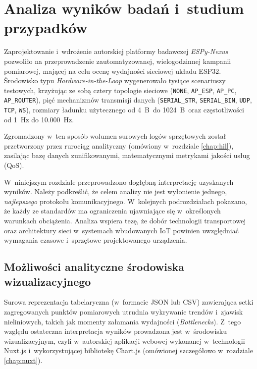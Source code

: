 \chapter{Analiza wyników badań i~studium przypadków}
\label{chap:analiza_wynikow}

Zaprojektowanie i~wdrożenie autorskiej platformy badawczej \textit{ESPy-Nexus} pozwoliło na przeprowadzenie zautomatyzowanej, wielogodzinnej kampanii pomiarowej, mającej na celu ocenę wydajności sieciowej układu ESP32.
Środowisko typu \textit{Hardware-in-the-Loop} wygenerowało tysiące scenariuszy testowych, krzyżując ze sobą cztery topologie sieciowe (\texttt{NONE}, \texttt{AP\_ESP}, \texttt{AP\_PC}, \texttt{AP\_ROUTER}), pięć mechanizmów transmisji danych (\texttt{SERIAL\_STR}, \texttt{SERIAL\_BIN}, \texttt{UDP}, \texttt{TCP}, \texttt{WS}), rozmiary ładunku użytecznego od 4~B~do 1024~B~oraz częstotliwości od 1~Hz do 10.000~Hz.

Zgromadzony w~ten sposób wolumen surowych logów sprzętowych został przetworzony przez rurociąg analityczny (omówiony w~rozdziale \ref{chap:hil}), zasilając bazę danych zunifikowanymi, matematycznymi metrykami jakości usług (QoS).

W~niniejszym rozdziale przeprowadzono dogłębną interpretację uzyskanych wyników.
Należy podkreślić, że celem analizy nie jest wyłonienie jednego, \textit{najlepszego} protokołu komunikacyjnego.
W~kolejnych podrozdziałach pokazano, że każdy ze standardów ma ograniczenia ujawniające się w~określonych warunkach obciążenia.
Analiza wspiera tezę, że dobór technologii transportowej oraz architektury sieci w~systemach wbudowanych IoT powinien uwzględniać wymagania czasowe i~sprzętowe projektowanego urządzenia.

\section{Możliwości analityczne środowiska wizualizacyjnego}
\label{sec:wizualizacja_nuxt}

Surowa reprezentacja tabelaryczna (w~formacie JSON lub CSV) zawierająca setki zagregowanych punktów pomiarowych utrudnia wykrywanie trendów i~zjawisk nieliniowych, takich jak momenty załamania wydajności (\textit{Bottlenecks}).
Z~tego względu ostateczna interpretacja wyników prowadzona jest w~środowisku wizualizacyjnym, czyli w~autorskiej aplikacji webowej wykonanej w~technologii Nuxt.js i~wykorzystującej bibliotekę Chart.js (omówionej szczegółowo w~rozdziale \ref{chap:nuxt}).

